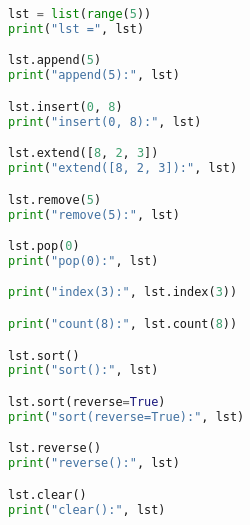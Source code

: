 \begin{table}[H]
	\centering
	\caption{列表方法}
\end{table}

\vspace{0.5cm}


\begin{lstlisting}[language=Python]
lst = list(range(5))
print("lst =", lst)

lst.append(5)
print("append(5):", lst)

lst.insert(0, 8)
print("insert(0, 8):", lst)

lst.extend([8, 2, 3])
print("extend([8, 2, 3]):", lst)

lst.remove(5)
print("remove(5):", lst)

lst.pop(0)
print("pop(0):", lst)

print("index(3):", lst.index(3))

print("count(8):", lst.count(8))

lst.sort()
print("sort():", lst)

lst.sort(reverse=True)
print("sort(reverse=True):", lst)

lst.reverse()
print("reverse():", lst)

lst.clear()
print("clear():", lst)
\end{lstlisting}

